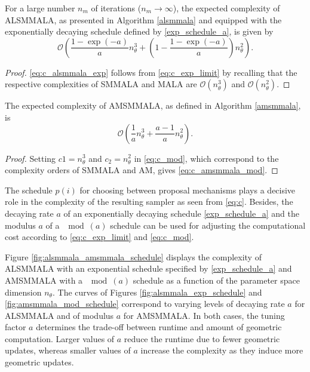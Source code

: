 \documentclass[twoside,11pt]{article}
\begin{document}
\begin{lemma}
For a large number $n_m$ of iterations ($n_m\rightarrow\infty$), the expected complexity of ALSMMALA, as presented in 
Algorithm \ref{alsmmala} and equipped with the exponentially decaying schedule defined by \eqref{exp_schedule_a}, is given by
\begin{equation}
\label{eq:c_alsmmala_exp}
\mathcal{O}\left(
\dfrac{1-\exp{(-a)}}{a}n_{\theta}^3+
\left(1-\dfrac{1-\exp{(-a)}}{a}\right)n_{\theta}^2
\right).
\end{equation}
\end{lemma}

\begin{proof}
\eqref{eq:c_alsmmala_exp} follows from \eqref{eq:c_exp_limit} by recalling that the respective complexities of SMMALA and 
MALA are $\mathcal{O}(n_{\theta}^3)$ and $\mathcal{O}(n_{\theta}^2)$.
\end{proof}

\begin{lemma}
The expected complexity of AMSMMALA, as defined in Algorithm \ref{amsmmala}, is
\begin{equation}
\label{eq:c_amsmmala_mod}
\mathcal{O}\left(
\dfrac{1}{a}n_{\theta}^3+
\dfrac{a-1}{a}n_{\theta}^2
\right).
\end{equation}
\end{lemma}

\begin{proof}
Setting $c1=n_{\theta}^3$ and $c_2=n_{\theta}^2$ in \eqref{eq:c_mod}, which correspond to the complexity orders of SMMALA 
and AM, gives \eqref{eq:c_amsmmala_mod}.
\end{proof}

The schedule $p(i)$ for choosing between proposal mechanisms plays a decisive role in the complexity of the resulting sampler
as seen from \eqref{eq:c}. Besides, the decaying rate $a$ of an exponentially decaying schedule \eqref{exp_schedule_a} and 
the modulus $a$ of a $\mod{(a)}$ schedule can be used for adjusting the computational cost according to 
\eqref{eq:c_exp_limit} and \eqref{eq:c_mod}.

Figure \ref{fig:alsmmala_amsmmala_schedule} displays the complexity of ALSMMALA with an exponential schedule specified by
\eqref{exp_schedule_a} and AMSMMALA with a $\mod{(a)}$ schedule as a function of the parameter space dimension $n_{\theta}$.
The curves of Figures \ref{fig:alsmmala_exp_schedule} and \ref{fig:amsmmala_mod_schedule} correspond to varying levels of 
decaying rate $a$ for ALSMMALA and of modulus $a$ for AMSMMALA. In both cases, the tuning factor $a$ determines the 
trade-off between runtime and amount of geometric computation. Larger values of $a$ reduce the runtime due to fewer 
geometric updates, whereas smaller values of $a$ increase the complexity as they induce more geometric updates.
\end{document}

